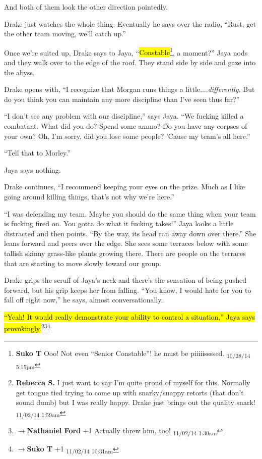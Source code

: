 And both of them look the other direction pointedly.

Drake just watches the whole thing. Eventually he says over the radio, ``Rust, get the other team moving, we'll catch up.''



Once we're suited up, Drake says to Jaya, ``\hl{Constable}\footnote{\textbf{Suko T }Ooo!  Not even ``Senior Constable''!  he must be piiiiissssed. \textsubscript{10/28/14 5:15pm}}, a moment?''  Jaya nods and they walk over to the edge of the roof.  They stand side by side and gaze into the abyss.

Drake opens with, ``I recognize that Morgan runs things a little....\textit{differently}.  But do you think you can maintain any more discipline than I've seen thus far?''

``I don't see any problem with our discipline,'' says Jaya.  ``We fucking killed a combatant.  What did you do?  Spend some ammo?  Do you have any corpses of your own?  Oh, I'm sorry, did you lose some people?  'Cause my team's all here.''

``Tell that to Morley.''

Jaya says nothing.

Drake continues, ``I recommend keeping your eyes on the prize.  Much as I like going around killing things, that's not why we're here.''

``I was defending my team.  Maybe you should do the same thing when your team is fucking fired on.  You gotta do what it fucking takes!''  Jaya looks a little distracted and then points.  ``By the way, its head ran away down over there.''  She leans forward and peers over the edge.  She sees some terraces below with some tallish skinny grass-like plants growing there.  There are people on the terraces that are starting to move slowly toward our group.

Drake grips the scruff of Jaya's neck and there's the sensation of being pushed forward, but his grip keeps her from falling.  ``You know, I would hate for you to fall off right now,'' he says, almost conversationally.

\hl{``Yeah!  It would really demonstrate your ability to control a situation,'' Jaya says provokingly.}\footnote{\textbf{Rebecca S. }I just want to say I'm quite proud of myself for this.  Normally get tongue tied trying to come up with snarky/snappy retorts (that don't sound dumb) but I was really happy.  Drake just brings out the quality snark! \textsubscript{11/02/14 1:59am}}\footnote{$\rightarrow$\textbf{Nathaniel Ford }+1 Actually threw him, too! \textsubscript{11/02/14 1:30am}}\footnote{$\rightarrow$\textbf{Suko T }+1 \textsubscript{11/02/14 10:31am}}


